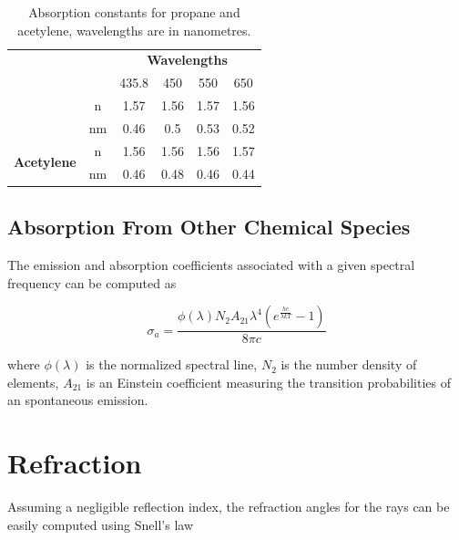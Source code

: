 \begin{table}[htbp!]
\centering
\caption{Absorption constants for propane and acetylene, wavelengths are in nanometres.}
\label{tb:soot_absorption_coefficients}
\begin{tabular}{cc|c|c|c|c|}
\cline{3-6}
                                                 &    & \multicolumn{4}{c|}{\textbf{Wavelengths}} \\ \cline{3-6} 
                                                 &    & 435.8   & 450    & 550   & 650   \\ \hhline{--|=|=|=|=|}
\multicolumn{1}{|c|}{\multirow{2}{*}{\textbf{Propane}}}   & \multicolumn{1}{c||}{n}  & 1.57    & 1.56   & 1.57  & 1.56  \\ \cline{2-6} 
\multicolumn{1}{|c|}{}                           & \multicolumn{1}{c||}{nm} & 0.46    & 0.5    & 0.53  & 0.52  \\ \hline
\multicolumn{1}{|c|}{\multirow{2}{*}{\textbf{Acetylene}}} & \multicolumn{1}{c||}{n}  & 1.56    & 1.56   & 1.56  & 1.57  \\ \cline{2-6} 
\multicolumn{1}{|c|}{}                           & \multicolumn{1}{c||}{nm} & 0.46    & 0.48   & 0.46  & 0.44  \\ \hline
\end{tabular}
\end{table}

\subsection{Absorption From Other Chemical Species}
\label{sec:absorption_from_chemical_species}

The emission and absorption coefficients associated with a given spectral frequency can be computed as


\begin{equation}
\sigma_a = \frac{\phi(\lambda) N_2 A_{21} \lambda^4 (e ^\frac{h c}{\lambda k T} - 1)}{8 \pi c}
\end{equation}

where $\phi(\lambda)$ is the normalized spectral line, $N_2$ is the number density of elements, $A_{21}$ is an Einstein coefficient measuring the transition probabilities of an spontaneous emission.

\section{Refraction}
\label{sec:refraction}

Assuming a negligible reflection index, the refraction angles for the rays can be easily computed using Snell's law


